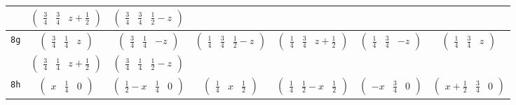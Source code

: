 \documentclass[fleqn,9pt,landscape]{jsarticle}
\begin{document}
\begin{center}
\begin{longtable}{ccccccc}
& $ \begin{pmatrix} \frac{3}{4} & \frac{3}{4} & z + \frac{1}{2} \end{pmatrix} $ & $ \begin{pmatrix} \frac{3}{4} & \frac{3}{4} & \frac{1}{2} - z \end{pmatrix} $ & $  $ & $  $ & $  $ & $  $ \\ \hline
{\tt 8g} & $ \begin{pmatrix} \frac{3}{4} & \frac{1}{4} & z \end{pmatrix} $ & $ \begin{pmatrix} \frac{3}{4} & \frac{1}{4} & - z \end{pmatrix} $ & $ \begin{pmatrix} \frac{1}{4} & \frac{3}{4} & \frac{1}{2} - z \end{pmatrix} $ & $ \begin{pmatrix} \frac{1}{4} & \frac{3}{4} & z + \frac{1}{2} \end{pmatrix} $ & $ \begin{pmatrix} \frac{1}{4} & \frac{3}{4} & - z \end{pmatrix} $ & $ \begin{pmatrix} \frac{1}{4} & \frac{3}{4} & z \end{pmatrix} $ \\
& $ \begin{pmatrix} \frac{3}{4} & \frac{1}{4} & z + \frac{1}{2} \end{pmatrix} $ & $ \begin{pmatrix} \frac{3}{4} & \frac{1}{4} & \frac{1}{2} - z \end{pmatrix} $ & $  $ & $  $ & $  $ & $  $ \\ \hline
{\tt 8h} & $ \begin{pmatrix} x & \frac{1}{4} & 0 \end{pmatrix} $ & $ \begin{pmatrix} \frac{1}{2} - x & \frac{1}{4} & 0 \end{pmatrix} $ & $ \begin{pmatrix} \frac{1}{4} & x & \frac{1}{2} \end{pmatrix} $ & $ \begin{pmatrix} \frac{1}{4} & \frac{1}{2} - x & \frac{1}{2} \end{pmatrix} $ & $ \begin{pmatrix} - x & \frac{3}{4} & 0 \end{pmatrix} $ & $ \begin{pmatrix} x + \frac{1}{2} & \frac{3}{4} & 0 \end{pmatrix} $ \\

\end{longtable}
\end{center}
\end{document}
